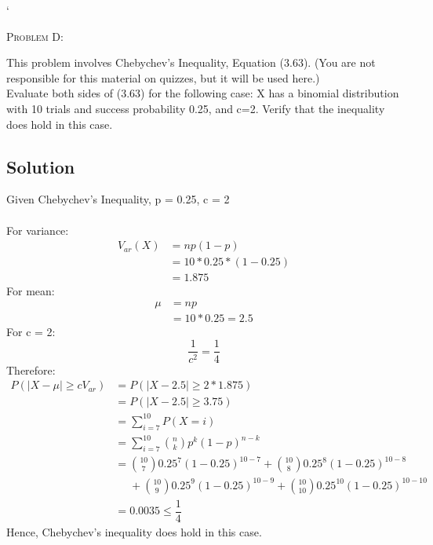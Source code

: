 \documentclass[12pt]{article}
\newenvironment{statement}[1]
{\begin{mdframed}[linewidth=0.6pt]
        \textsc{ #1:}

}
    {\end{mdframed}}
\begin{document}
`

\newpage
\begin{statement}{Problem D}
    This problem involves Chebychev's Inequality, Equation (3.63). (You are not responsible for this material on quizzes, but it will be used here.)\\

    Evaluate both sides of (3.63) for the following case: X has a binomial distribution with 10 trials and success probability 0.25, and c=2. Verify that the inequality does hold in this case.
\end{statement}

\subsection*{Solution}
Given Chebychev's Inequality, p = 0.25, c = 2\\\\
For variance:
\begin{equation}
    \begin{aligned}
        V_{ar}(X)&=np(1-p)\\
        &=10*0.25*(1-0.25)\\
        &=1.875
    \end{aligned}
\end{equation}
For mean:
\begin{equation}
    \begin{aligned}
        \mu&=np\\
        &=10*0.25=2.5
    \end{aligned}
\end{equation}
For c = 2:
\begin{equation}
    \dfrac{1}{c^2}=\dfrac{1}{4}
\end{equation}
Therefore:
\begin{equation}
    \begin{aligned}
        P(|X-\mu|\geq cV_{ar})&=P(|X-2.5|\geq 2*1.875)\\
        &=P(|X-2.5|\geq 3.75)\\
        &=\sum\limits_{i=7}^{10}P(X=i)\\
        &=\sum\limits_{i=7}^{10}\binom{n}{k}p^k(1-p)^{n-k}\\
        &=\binom{10}{7}0.25^7(1-0.25)^{10-7}+\binom{10}{8}0.25^8(1-0.25)^{10-8}\\
        &\ \ \ \ \ \ +\binom{10}{9}0.25^9(1-0.25)^{10-9}+\binom{10}{10}0.25^{10}(1-0.25)^{10-10}\\
        &=0.0035\leq\dfrac{1}{4}
    \end{aligned}
\end{equation}
Hence, Chebychev's inequality does hold in this case.
\end{document}
